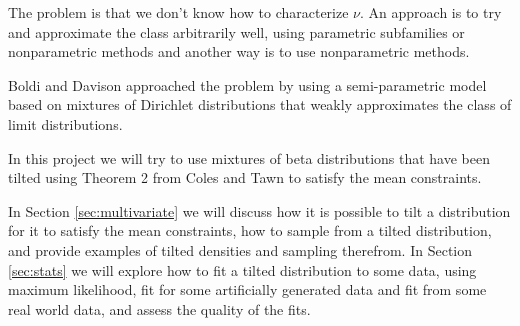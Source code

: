 The problem is that we don't know how to characterize $\nu$. An approach is to try and approximate the class arbitrarily well, using parametric subfamilies or nonparametric methods and another way is to use nonparametric methods.

Boldi and Davison \cite{BoldiDavison} approached the problem by using a semi-parametric model based on mixtures of Dirichlet distributions that weakly approximates the class of limit distributions.

In this project we will try to use mixtures of beta distributions that have been tilted using Theorem 2 from Coles and Tawn \cite{ColesTawn} to satisfy the mean constraints.

In Section \ref{sec:multivariate} we will discuss how it is possible to tilt a distribution for it to satisfy the mean constraints, how to sample from a tilted distribution, and provide examples of tilted densities and sampling therefrom. 
In Section \ref{sec:stats} we will explore how to fit a tilted distribution to some data, using maximum likelihood, fit for some artificially generated data and fit from some real world data, and assess the quality of the fits.